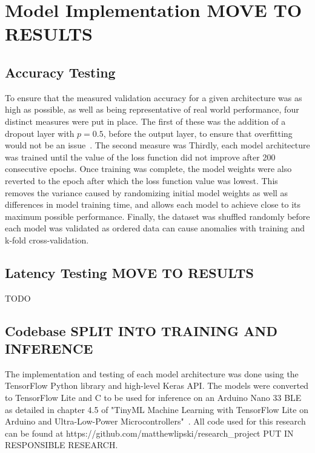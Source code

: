 \section{Model Implementation MOVE TO RESULTS}\label{sec:model-implementation}
\subsection{Accuracy Testing}\label{subsec:validation-accuracy-testing}
To ensure that the measured validation accuracy for a given architecture was as high as possible, as well as being representative of real world performance, four distinct measures were put in place.
The first of these was the addition of a dropout layer with $p=0.5$, before the output layer, to ensure that overfitting would not be an issue~\cite{JMLR:v15:srivastava14a}.
The second measure was%
Thirdly, each model architecture was trained until the value of the loss function did not improve after 200 consecutive epochs.
Once training was complete, the model weights were also reverted to the epoch after which the loss function value was lowest.
This removes the variance caused by randomizing initial model weights as well as differences in model training time, and allows each model to achieve close to its maximum possible performance.
Finally, the dataset was shuffled randomly before each model was validated as ordered data can cause anomalies with training and k-fold cross-validation.

\subsection{Latency Testing MOVE TO RESULTS}\label{subsec:latency-testing}
TODO

\subsection{Codebase SPLIT INTO TRAINING AND INFERENCE}\label{subsec:testing-framework}
The implementation and testing of each model architecture was done using the TensorFlow Python library and high-level Keras API\@.
The models were converted to TensorFlow Lite and C to be used for inference on an Arduino Nano 33 BLE as detailed in chapter 4.5 of "TinyML Machine Learning with TensorFlow Lite on Arduino and Ultra-Low-Power Microcontrollers"~\cite{warden2020tinyml}.
All code used for this research can be found at https://github.com/matthewlipski/research\_project PUT IN RESPONSIBLE RESEARCH.